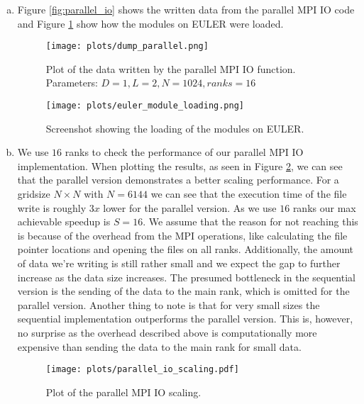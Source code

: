 \documentclass[a4paper,10pt]{article} %
\begin{document}
\begin{enumerate}[a)]
\setcounter{enumi}{0}
\item 
Figure \ref{fig:parallel_io} shows the written data from the parallel MPI IO code and Figure \ref{fig:euler} show how the modules on EULER were loaded.
\begin{figure}[h!]
  \centering
  \begin{minipage}[t]{0.8\textwidth}
    \texttt{[image: plots/dump\_parallel.png]}
    \caption{Plot of the data written by the parallel MPI IO function. Parameters: $D = 1, L = 2, N = 1024, ranks = 16$}
    \label{fig:parallel_io}
  \end{minipage}
  \hfill
  \begin{minipage}[t]{0.8\textwidth}
    \texttt{[image: plots/euler\_module\_loading.png]}
    \caption{Screenshot showing the loading of the modules on EULER.}
    \label{fig:euler}
  \end{minipage}
\end{figure}
    
\item
We use $16$ ranks to check the performance of our parallel MPI IO implementation. When plotting the results, as seen in Figure \ref{fig:parallel_scaling}, we can see that the parallel version demonstrates a better scaling performance. For a gridsize $N \times N$ with $N = 6144$ we can see that the execution time of the file write is roughly $3x$ lower for the parallel version. As we use $16$ ranks our max achievable speedup is $S = 16$. We assume that the reason for not reaching this is because of the overhead from the MPI operations, like calculating the file pointer locations and opening the files on all ranks. Additionally, the amount of data we're writing is still rather small and we expect the gap to further increase as the data size increases. The presumed bottleneck in the sequential version is the sending of the data to the main rank, which is omitted for the parallel version. Another thing to note is that for very small sizes the sequential implementation outperforms the parallel version. This is, however, no surprise as the overhead described above is computationally more expensive than sending the data to the main rank for small data.

\begin{figure}[h!]
  \centering
  \begin{minipage}[t]{0.8\textwidth}
    \texttt{[image: plots/parallel\_io\_scaling.pdf]}
    \caption{Plot of the parallel MPI IO scaling.}
    \label{fig:parallel_scaling}
  \end{minipage}
\end{figure}

\end{enumerate}
\bigskip

\printbibliography

\end{document}
